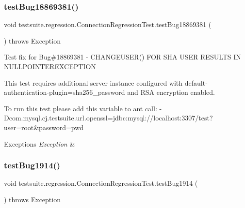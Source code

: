 \subsubsection{\texorpdfstring{test\+Bug18869381()}{testBug18869381()}}
{\footnotesize\ttfamily void testsuite.\+regression.\+Connection\+Regression\+Test.\+test\+Bug18869381 (\begin{DoxyParamCaption}{ }\end{DoxyParamCaption}) throws Exception}

Test fix for Bug\#18869381 -\/ C\+H\+A\+N\+G\+E\+U\+S\+E\+R() F\+OR S\+HA U\+S\+ER R\+E\+S\+U\+L\+TS IN N\+U\+L\+L\+P\+O\+I\+N\+T\+E\+R\+E\+X\+C\+E\+P\+T\+I\+ON

This test requires additional server instance configured with default-\/authentication-\/plugin=sha256\+\_\+password and R\+SA encryption enabled.

To run this test please add this variable to ant call\+: -\/\+Dcom.\+mysql.\+cj.\+testsuite.\+url.\+openssl=jdbc\+:mysql\+://localhost\+:3307/test?user=root\&password=pwd


\begin{DoxyExceptions}{Exceptions}
{\em Exception} & \\
\hline
\end{DoxyExceptions}
\mbox{\label{classtestsuite_1_1regression_1_1_connection_regression_test_a4e3b703a4128c3a6aef0462052f61225}} 
\subsubsection{\texorpdfstring{test\+Bug1914()}{testBug1914()}}
{\footnotesize\ttfamily void testsuite.\+regression.\+Connection\+Regression\+Test.\+test\+Bug1914 (\begin{DoxyParamCaption}{ }\end{DoxyParamCaption}) throws Exception}

\mbox{\label{classtestsuite_1_1regression_1_1_connection_regression_test_a3eea52c252e252b39fbfb93bcc80d26a}} 
